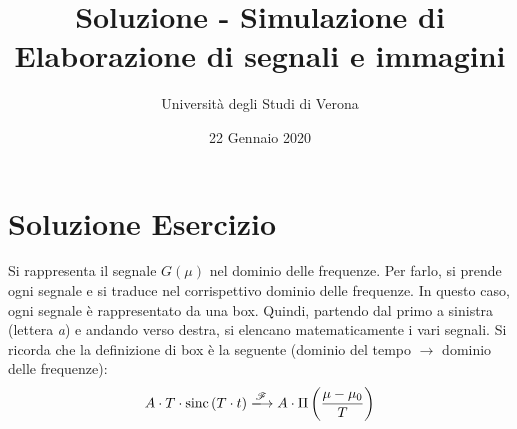 \documentclass[a4paper]{article}
\begin{document}
	\author{Università degli Studi di Verona}
	\title{Soluzione - Simulazione di Elaborazione di segnali e immagini}
	\date{{\Large 22 Gennaio 2020}}
	\maketitle
	
	\section{Soluzione Esercizio}
	
	Si rappresenta il segnale $G\left(\mu\right)$ nel dominio delle frequenze. Per farlo, si prende ogni segnale e si traduce nel corrispettivo dominio delle frequenze. In questo caso, ogni segnale è rappresentato da una box. Quindi, partendo dal primo a sinistra (lettera \emph{a}) e andando verso destra, si elencano matematicamente i vari segnali. Si ricorda che la definizione di box è la seguente (dominio del tempo $\rightarrow$ dominio delle frequenze):
	\begin{equation*}
		A \cdot T \cdot \mathrm{sinc}\left(T \cdot t\right) \xlongrightarrow{\mathscr{F}} A \cdot \Pi\left(\dfrac{\mu - \mu_{0}}{T}\right)
	\end{equation*}
\end{document}

